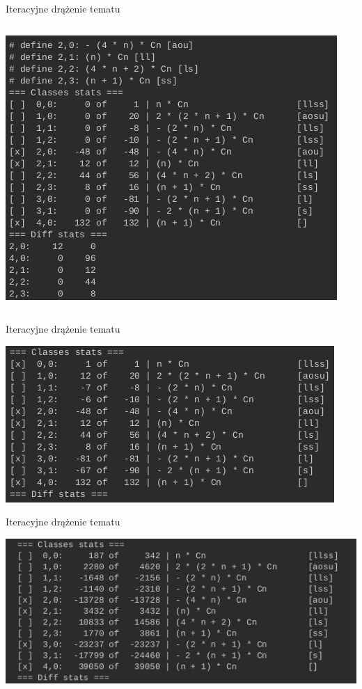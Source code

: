 \documentclass[final]{beamer}
\theoremstyle{bluetheorem}
\theoremstyle{bluetheorem}
\theoremstyle{greentheorem}
\begin{document}
\begin{frame}{Iteracyjne drążenie tematu}
\begin{columns}
\begin{block}{}
\begin{center}
                \includegraphics[width=.8\textwidth]{framework_008.png}
            \end{center}
        \end{block}
    \end{columns}
\end{frame}


\begin{frame}{Iteracyjne drążenie tematu}
    \begin{block}{}
        \begin{center}
            \includegraphics[width=\textwidth]{framework_009.png}
        \end{center}
    \end{block}
\end{frame}

\begin{frame}{Iteracyjne drążenie tematu}
    \begin{block}{}
        \begin{center}
            \includegraphics[width=\textwidth]{framework_011.png}
        \end{center}
    \end{block}
\end{frame}
\end{document}
